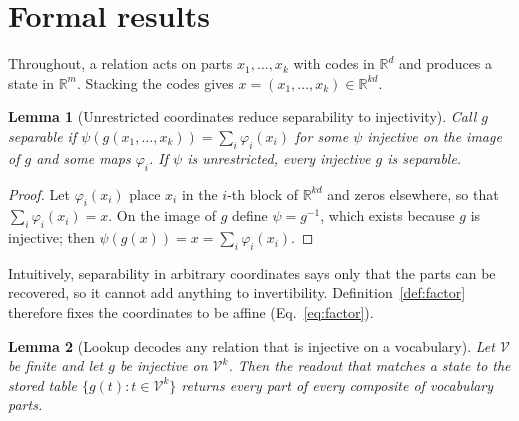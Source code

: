 \documentclass[10pt]{article}
\theoremstyle{plain}
\newtheorem{lemma}{Lemma}
\theoremstyle{remark}
\newcommand{\R}{\mathbb{R}}
\newcommand{\Voc}{\mathcal{V}}
\begin{document}
\FloatBarrier



\clearpage
\appendix
\makeatletter\let\@fb@secFB\relax\makeatother %

\section{Formal results}
\label{app:proofs}

Throughout, a relation acts on parts $x_1, \ldots, x_k$ with codes in $\R^d$ and produces a state in $\R^m$. Stacking the codes gives $x = (x_1, \ldots, x_k) \in \R^{kd}$.



\begin{lemma}[Unrestricted coordinates reduce separability to injectivity]
\label{lem:psi}
Call $g$ separable if $\psi(g(x_1, \ldots, x_k)) = \sum_i \varphi_i(x_i)$ for some $\psi$ injective on the image of $g$ and some maps $\varphi_i$. If $\psi$ is unrestricted, every injective $g$ is separable.
\end{lemma}

\begin{proof}
Let $\varphi_i(x_i)$ place $x_i$ in the $i$-th block of $\R^{kd}$ and zeros elsewhere, so that $\sum_i \varphi_i(x_i) = x$. On the image of $g$ define $\psi = g^{-1}$, which exists because $g$ is injective; then $\psi(g(x)) = x = \sum_i \varphi_i(x_i)$.
\end{proof}

\noindent
Intuitively, separability in arbitrary coordinates says only that the parts can be recovered, so it cannot add anything to invertibility. Definition~\ref{def:factor} therefore fixes the coordinates to be affine (Eq.~\ref{eq:factor}).

\begin{lemma}[Lookup decodes any relation that is injective on a vocabulary]
\label{lem:lookup}
Let $\Voc$ be finite and let $g$ be injective on $\Voc^k$. Then the readout that matches a state to the stored table $\{g(t) : t \in \Voc^k\}$ returns every part of every composite of vocabulary parts.
\end{lemma}
\end{document}
